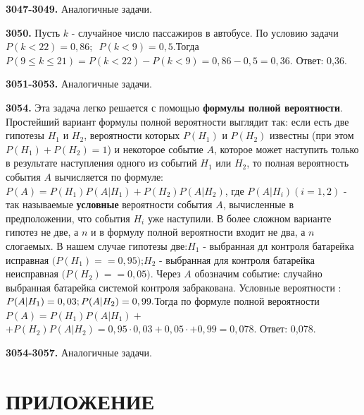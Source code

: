 \textbf{3047-3049.} Аналогичные задачи.

\textbf{3050.} Пусть $k$ - случайное число пассажиров в автобусе. По условию задачи $P(k<22)=0,86;\enspace P(k<9)=0,5.$\newline Тогда $P(9\leq k\leq21)=P(k<22)-P(k<9)=0,86-0,5=0,36.$ \newline \null \hspace*{\fill} Ответ: 0,36. 

\textbf{3051-3053.} Аналогичные задачи.

\textbf{3054.} Эта задача легко решается с помощью \textbf{формулы полной вероятности}. Простейший вариант формулы полной вероятности выглядит так: если есть две гипотезы $H_1$ и $H_2$, вероятности которых $P(H_1)$ и $P(H_2)$ известны (при этом $P(H_1) + P(H_2)=1$) и некоторое событие $A$, которое может наступить только в результате наступления одного из событий $H_1$ или $H_2$, то полная вероятность события $A$ вычисляется по формуле: \newline$P(A)=P(H_1)P(A|H_1)+P(H_2)P(A|H_2)$, где $P(A|H_i)(i=1,2)$ - так называемые \textbf{условные} вероятности события $A$, вычисленные в предположении, что события $H_i$ уже наступили. В более сложном варианте гипотез не две, а $n$ и в формулу полной вероятности входит не два, а $n$ слогаемых. В нашем случае гипотезы две:\newline $H_1$ - выбранная дл контроля батарейка исправная $(P(H_1)=$\newline$=0,95)$;\newline$H_2$ - выбранная для контроля батарейка неисправная $(P(H_2)=$\newline$=0,05).$
Через $A$ обозначим событие: случайно выбранная батарейка системой контроля забракована. Условные вероятности : $P(A|H_1)=0,03;\newline P(A|H_2)=0,99.$\newline Тогда по формуле полной вероятности $P(A)=P(H_1)P(A|H_1)+$\newline$+P(H_2)P(A|H_2)=0,95\cdot0,03+0,05\cdot+0,99=0,078.$ \newline \null \hspace*{\fill} Ответ: 0,078. 


\textbf{3054-3057.} Аналогичные задачи.

\chapter*{ПРИЛОЖЕНИЕ}
